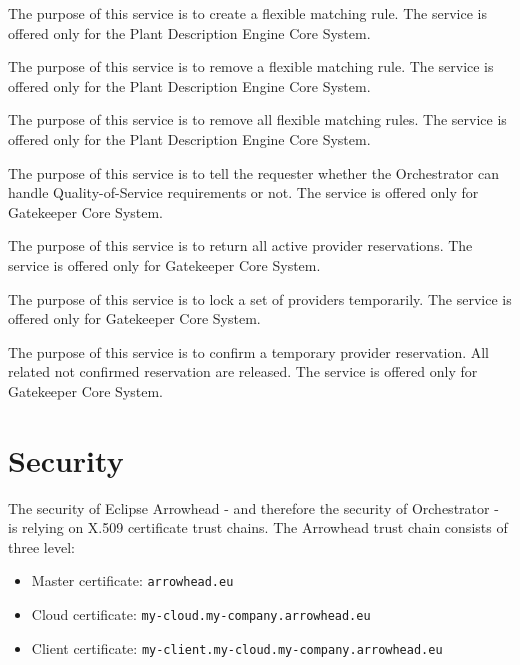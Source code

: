 \documentclass[a4paper]{arrowhead}
\begin{document}
The purpose of this service is to create a flexible matching rule. The service is offered only for the Plant Description Engine Core System.

The purpose of this service is to remove a flexible matching rule. The service is offered only for the Plant Description Engine Core System.

The purpose of this service is to remove all flexible matching rules. The service is offered only for the Plant Description Engine Core System.

The purpose of this service is to tell the requester whether the Orchestrator can handle Quality-of-Service requirements or not. The service is offered only for Gatekeeper Core System.

The purpose of this service is to return all active provider reservations. The service is offered only for Gatekeeper Core System. 

The purpose of this service is to lock a set of providers temporarily. The service is offered only for Gatekeeper Core System. 

The purpose of this service is to confirm a temporary provider reservation. All related not confirmed reservation are released. The service is offered only for Gatekeeper Core System. 

\newpage

\section{Security}
\label{sec:security}

The security of Eclipse Arrowhead - and therefore the security of Orchestrator  - is relying on X.509 certificate trust chains. The Arrowhead trust chain consists of three level:
\begin{itemize}
    \item Master certificate: \texttt{arrowhead.eu}
    \item Cloud certificate: \texttt {my-cloud.my-company.arrowhead.eu}
    \item Client certificate: \texttt{my-client.my-cloud.my-company.arrowhead.eu}
\end{itemize}
\end{document}
